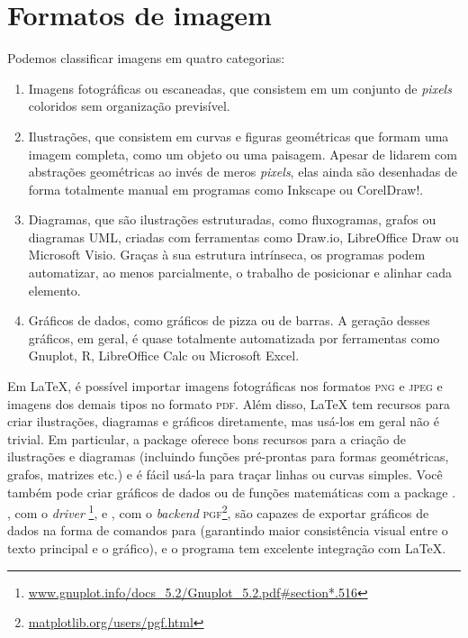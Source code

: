 \section{Formatos de imagem}
\label{sec:graficos}

Podemos classificar imagens em quatro categorias:

\begin{enumerate}
    \item Imagens fotográficas ou escaneadas, que consistem em um conjunto
    de \emph{pixels} coloridos sem organização previsível.

    \item Ilustrações, que consistem em curvas e figuras geométricas
    que formam uma imagem completa, como um objeto ou uma paisagem.
    Apesar de lidarem com abstrações geométricas ao invés de meros
    \emph{pixels}, elas ainda são desenhadas de forma totalmente manual
    em programas como Inkscape ou CorelDraw!.

    \item Diagramas, que são ilustrações estruturadas, como fluxogramas,
    grafos ou diagramas UML, criadas com ferramentas como Draw.io,
    LibreOffice Draw ou Microsoft Visio. Graças à sua estrutura intrínseca,
    os programas podem automatizar, ao menos parcialmente, o trabalho de
    posicionar e alinhar cada elemento.

    \item Gráficos de dados, como gráficos de pizza ou de barras. A
    geração desses gráficos, em geral, é quase totalmente automatizada
    por ferramentas como Gnuplot, R, LibreOffice Calc ou Microsoft Excel.
\end{enumerate}

Em \LaTeX{}, é possível importar imagens fotográficas nos formatos
\textsc{png} e \textsc{jpeg} e imagens dos demais tipos no formato
\textsc{pdf}. Além disso, \LaTeX{} tem recursos para criar ilustrações,
diagramas e gráficos diretamente, mas usá-los em geral não é trivial.
Em particular, a package  oferece bons recursos para a
criação de ilustrações e diagramas (incluindo funções pré-prontas
para formas geométricas, grafos, matrizes etc.) e é fácil usá-la
para traçar linhas ou curvas simples. Você também pode criar gráficos
de dados ou de funções matemáticas com a package .
, com o \emph{driver} \footnote{
\url{www.gnuplot.info/docs\_5.2/Gnuplot\_5.2.pdf\#section*.516}}, e
, com o \emph{backend} \textsc{pgf}\footnote{
\url{matplotlib.org/users/pgf.html}}, são capazes de exportar gráficos
de dados na forma de comandos para  (garantindo maior
consistência visual entre o texto principal e o gráfico), e o programa
 tem excelente integração com \LaTeX{}.

